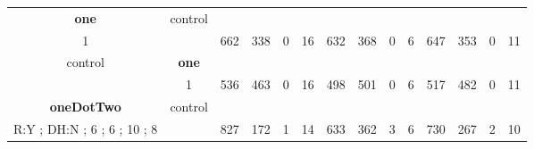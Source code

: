 \begin{table}[]
{\begin{tabular}{|c|c|c|c|c|c|c|c|c|c|c|c|c|c|}
\cellcolor{blue!15}\textbf{one} & control& {\color[HTML]{00009B} } & {\color[HTML]{9A0000} } & {\color[HTML]{009901} } &  & {\color[HTML]{00009B} } & {\color[HTML]{9A0000} } & {\color[HTML]{009901} } &  & {\color[HTML]{00009B} } & {\color[HTML]{9A0000} } & {\color[HTML]{009901} } &  \\ 
\cellcolor{ blue!15}1 &  & \multirow{-2}{*}{{\color[HTML]{00009B} 662}} & \multirow{-2}{*}{{\color[HTML]{9A0000} 338}} & \multirow{-2}{*}{{\color[HTML]{009901} 0}} & \multirow{-2}{*}{16} & \multirow{-2}{*}{{\color[HTML]{00009B} 632}} & \multirow{-2}{*}{{\color[HTML]{9A0000} 368}} & \multirow{-2}{*}{{\color[HTML]{009901} 0}} & \multirow{-2}{*}{6} & \multirow{-2}{*}{{\color[HTML]{00009B} 647}} & \multirow{-2}{*}{{\color[HTML]{9A0000} 353}} & \multirow{-2}{*}{{\color[HTML]{009901} 0}} & \multirow{-2}{*}{11} \\ \hline

control & \cellcolor{blue!15}\textbf{one}& {\color[HTML]{00009B} } & {\color[HTML]{9A0000} } & {\color[HTML]{009901} } &  & {\color[HTML]{00009B} } & {\color[HTML]{9A0000} } & {\color[HTML]{009901} } &  & {\color[HTML]{00009B} } & {\color[HTML]{9A0000} } & {\color[HTML]{009901} } &  \\ 
 & \cellcolor{ blue!15}1 & \multirow{-2}{*}{{\color[HTML]{00009B} 536}} & \multirow{-2}{*}{{\color[HTML]{9A0000} 463}} & \multirow{-2}{*}{{\color[HTML]{009901} 0}} & \multirow{-2}{*}{16} & \multirow{-2}{*}{{\color[HTML]{00009B} 498}} & \multirow{-2}{*}{{\color[HTML]{9A0000} 501}} & \multirow{-2}{*}{{\color[HTML]{009901} 0}} & \multirow{-2}{*}{6} & \multirow{-2}{*}{{\color[HTML]{00009B} 517}} & \multirow{-2}{*}{{\color[HTML]{9A0000} 482}} & \multirow{-2}{*}{{\color[HTML]{009901} 0}} & \multirow{-2}{*}{11} \\ \hline


\cellcolor{blue!15}\textbf{oneDotTwo} & control& {\color[HTML]{00009B} } & {\color[HTML]{9A0000} } & {\color[HTML]{009901} } &  & {\color[HTML]{00009B} } & {\color[HTML]{9A0000} } & {\color[HTML]{009901} } &  & {\color[HTML]{00009B} } & {\color[HTML]{9A0000} } & {\color[HTML]{009901} } &  \\ 
\cellcolor{ blue!15}R:Y ; DH:N ; 6 ; 6 ; 10 ; 8 &  & \multirow{-2}{*}{{\color[HTML]{00009B} 827}} & \multirow{-2}{*}{{\color[HTML]{9A0000} 172}} & \multirow{-2}{*}{{\color[HTML]{009901} 1}} & \multirow{-2}{*}{14} & \multirow{-2}{*}{{\color[HTML]{00009B} 633}} & \multirow{-2}{*}{{\color[HTML]{9A0000} 362}} & \multirow{-2}{*}{{\color[HTML]{009901} 3}} & \multirow{-2}{*}{6} & \multirow{-2}{*}{{\color[HTML]{00009B} 730}} & \multirow{-2}{*}{{\color[HTML]{9A0000} 267}} & \multirow{-2}{*}{{\color[HTML]{009901} 2}} & \multirow{-2}{*}{10} \\ \hline


\end{tabular}}
\end{table}
